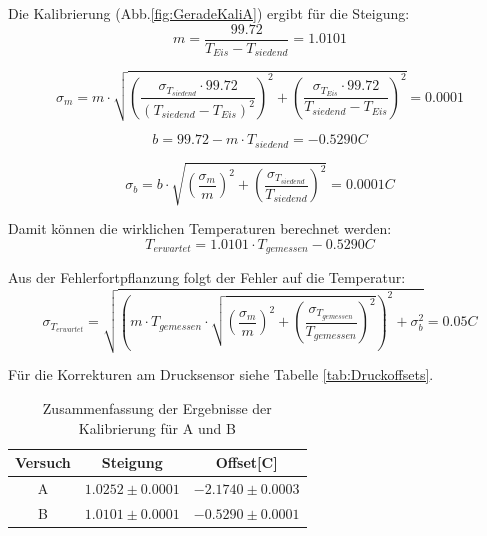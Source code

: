 \documentclass[12pt,a4paper]{article}
\begin{document}
Die Kalibrierung (Abb.\ref{fig:GeradeKaliA}) ergibt für die Steigung:
\begin{equation}
m = \dfrac{99.72}{T_{Eis}-T_{siedend}} = 1.0101
\end{equation}

\begin{equation}
\sigma_{m} = m\cdot \sqrt{(\dfrac{\sigma_{T_{siedend}}\cdot 99.72}{(T_{siedend}-T_{Eis})^{2}})^{2}+(\dfrac{\sigma_{T_{Eis}}\cdot 99.72}{T_{siedend}-T_{Eis}})^{2}} = 0.0001
\end{equation}

\begin{equation}
b = 99.72-m\cdot T_{siedend} = -0.5290C
\end{equation}

\begin{equation}
\sigma_{b} = b\cdot \sqrt{(\dfrac{\sigma_{m}}{m})^{2}+(\dfrac{\sigma_{T_{siedend}}}{T_{siedend}})^{2}} = 0.0001C
\end{equation}


Damit können die wirklichen Temperaturen berechnet werden:
\begin{equation}
T_{erwartet}=1.0101\cdot T_{gemessen}-0.5290C
\end{equation}

Aus der Fehlerfortpflanzung folgt der Fehler auf die Temperatur:
\begin{equation}
\sigma_{T_{erwartet}}=\sqrt{\left(m\cdot T_{gemessen}\cdot \sqrt{ (\dfrac{\sigma_m}{m})^{2}+(\dfrac{\sigma_{T_{gemessen}}}{T_{gemessen}})^{2}}\right)^{2}+\sigma_{b}^{2}}=0.05C
\end{equation}

Für die Korrekturen am Drucksensor siehe Tabelle \ref{tab:Druckoffsets}.

\begin{table}
\begin{center}
\begin{tabular}{|c|c|c|}
\hline
Versuch & Steigung & Offset[C]\\
\hline
A & $1.0252 \pm 0.0001$ & $-2.1740 \pm 0.0003$\\
\hline
B & $1.0101 \pm 0.0001$ & $-0.5290 \pm 0.0001$\\
\hline
\end{tabular}
\end{center}
\caption{Zusammenfassung der Ergebnisse der Kalibrierung für A und B}
\label{tab:KaliErgebnisseAundB}
\end{table}
\end{document}
